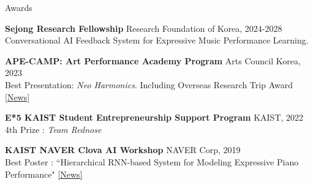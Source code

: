 \documentclass{resume} %
\begin{document}


\begin{rSection}{Awards}
\item {\bf Sejong Research Fellowship}  \hfill  Research Foundation of Korea, 2024-2028
\\ Conversational AI Feedback System for Expressive Music Performance Learning.
\item {\bf APE-CAMP: Art Performance Academy Program}  \hfill  Arts Council Korea, 2023
\\ Best Presentation: \textit{Neo Harmonics}. Including Overseas Research Trip Award \href{https://www.aitimes.com/news/articleView.html?idxno=147866}{[News]}
\item {\bf E*5 KAIST Student Entrepreneurship Support Program} \hfill KAIST, 2022
\\ 4th Prize : \textit{Team Rednose}
\item {\bf KAIST NAVER Clova AI Workshop} \hfill NAVER Corp, 2019
\\ Best Poster : ``Hierarchical RNN-based System for Modeling Expressive Piano Performance" \href{https://ct.kaist.ac.kr/boards/view/news_board/1615/180/}{[News]}


\end{rSection}
\end{document}
